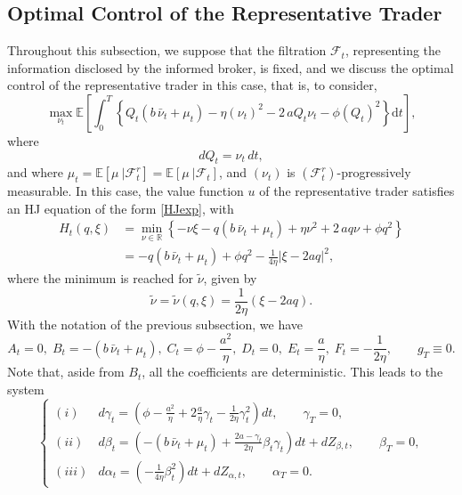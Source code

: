 \documentclass[10pt]{article}
\def\d{\mathrm{d}}
\begin{document}
\subsection{Optimal Control of the Representative Trader}\label{Optimal_Control_Representative_Trader_Mean_Field_Setting}

Throughout this subsection, we suppose that the filtration $\mathcal{F}_t$, representing the information disclosed by the informed broker, is fixed, and we discuss the optimal control of the representative trader in this case, that is, to consider,
$$
\max_{\nu_t} \mathbb{E} \left[ \int_0^T \left\{ Q_t \left(b\,\bar \nu_t + \mu_t \right) - \eta \left( \nu_t \right)^2 - 2\,a Q_t \nu_t - \phi \left( Q_t \right)^2 \right\} \d t \right],
$$
where 
$$
dQ_t = \nu_t \, dt,
$$
and where $\mu_t = \mathbb{E}[\mu\ |\mathcal{F}^r_t] = \mathbb{E}[\mu\ |\mathcal{F}_t]$, and $(\nu_t)$ is $(\mathcal{F}^r_t)$-progressively measurable. In this case, the value function $u$ of the representative trader satisfies an HJ equation of the form \eqref{HJexp}, with
\begin{align*}
H_t(q,\xi) &= \min_{\nu \in \mathbb{R}} \left\{ -\nu\xi - q \left(b\,\bar \nu_t + \mu_t \right) + \eta \nu^2 + 2\,a q \nu + \phi q^2 \right\} \\
& = -q \left(b\,\bar \nu_t + \mu_t \right) + \phi q^2 - \frac{1}{4\eta} |\xi - 2a q|^2,
\end{align*}
where the minimum is reached for $\tilde{\nu}$, given by 
$$
\tilde{\nu} = \tilde{\nu}(q, \xi) = \frac{1}{2\eta} (\xi - 2a q).
$$
With the notation of the previous subsection, we have
$$
A_t = 0, \; B_t = - \left(b\,\bar \nu_t + \mu_t \right), \; C_t = \phi - \frac{a^2}{\eta}, \; D_t = 0, \; E_t = \frac{a}{\eta}, \; F_t = -\frac{1}{2\eta}, \qquad g_T \equiv 0.
$$
Note that, aside from $B_t$, all the coefficients are deterministic. This leads to the system 
\begin{equation}\label{riccati_equation}
    \left\{
        \begin{array}{ll}
        (i) & d\gamma_t = \left(\phi - \frac{a^2}{\eta} + 2\frac{a}{\eta} \gamma_t - \frac{1}{2\eta} \gamma_t^2 \right) dt, \qquad \gamma_T = 0, \\ [1ex]
        (ii) & d\beta_t = \left(- \left(b\,\bar \nu_t + \mu_t \right) + \frac{2a - \gamma_t}{2\eta} \beta_t \gamma_t \right) dt + dZ_{\beta,t}, \qquad \beta_T = 0, \\ [1ex]
        (iii) & d\alpha_t = \left(-\frac{1}{4\eta} \beta_t^2 \right) dt + dZ_{\alpha,t}, \qquad \alpha_T = 0.
        \end{array}\right.
\end{equation}
\end{document}
